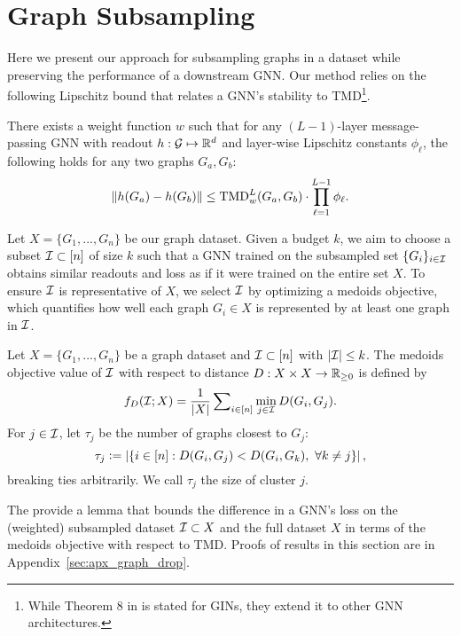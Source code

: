 \newcommand{\xmark}{\ensuremath{\boldsymbol{\times}}}

\section{Graph Subsampling}\label{sec:graph_drop}

Here we present our approach for subsampling graphs in a dataset while preserving the performance of a downstream GNN.  Our method relies on the following Lipschitz bound that relates a GNN's stability to TMD\footnote{While Theorem 8 in \citet{Chuang22:Tree} is stated for GINs, they extend it to other GNN architectures.}.

\begin{theorem}\label{thm:stable} {There exists a weight function $w$ such that} for any $(L-1)$-layer message-passing GNN with readout $h: \mathcal G \mapsto \mathbb R^d$ and layer-wise Lipschitz constants $\phi_\ell$, the following holds for any two graphs $G_a, G_b$: \[\left\lVert h(G_a) - h(G_b)\right\rVert\leq \textnormal{TMD}_{w}^{L} (G_a, G_b) \cdot \prod_{\ell=1}^{L-1} \phi_\ell.\] 
\end{theorem}

Let $X= \{G_1, ..., G_n\}$ be our graph dataset. Given a budget $k$, we aim to choose a subset $\mathcal I \subset [n]$ of size $k$ such that a GNN trained on the subsampled set {$\{G_i\}_{i \in \mathcal I}$} obtains similar readouts and loss as if it were trained on the entire set $X$.
To ensure $\mathcal I$ is representative of $X$, we select $\mathcal I$ by optimizing a medoids objective, which quantifies how well each graph $G_i \in X$ is represented by at least one graph in $\mathcal I$. 

\begin{definition} Let $X= \{G_1, ..., G_n\}$ be a graph dataset and $\mathcal I \subset [n]$ with $\lvert \mathcal I \rvert \leq k$. The medoids objective value of $\mathcal I$ with respect to distance $D : X \times X \to \mathbb R_{\geq 0}$ is defined by 
\begin{align*}
    f_D(\mathcal I; X) = \frac{1}{\left\lvert X\right\rvert}\sum\nolimits_{i \in [n]} \min_{j \in\mathcal I} D(G_i, G_j).
\end{align*}
For $j \in \mathcal I$, let $\tau_j$ be the number of graphs closest to $G_j$:
\[\tau_j \mathrel{\mathop:}= \left\lvert\{i \in [n]: D(G_i, G_j) < D(G_i, G_k),~\forall k \neq j\}\right\rvert,\]
breaking ties arbitrarily. We call $\tau_j$ the size of cluster $j$. 
\end{definition}

The provide a lemma that bounds the difference in a GNN's loss on the (weighted) subsampled dataset $\mathcal I \subset X$ and the full dataset $X$ in terms of the medoids objective with respect to TMD. Proofs of results in this section are in Appendix~\ref{sec:apx_graph_drop}.

